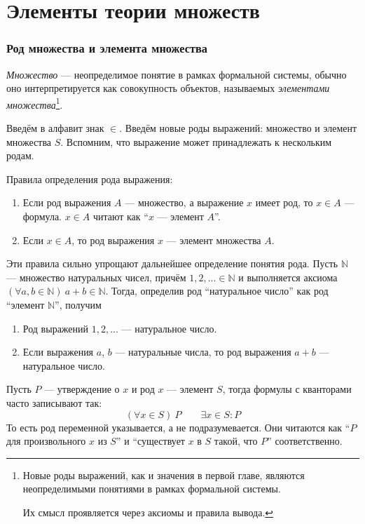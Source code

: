 \part{Элементы теории множеств}

\section{Род множества и элемента множества}

 {\it Множество} --- неопределимое понятие в рамках формальной системы,
обычно оно интерпретируется как совокупность объектов,
называемых {\it элементами множества}\footnote{
	Новые роды выражений, как и значения в первой главе,
	являются неопределимыми понятиями в рамках
	формальной системы.

	Их смысл проявляется через аксиомы и правила вывода.
}.

Введём в алфавит знак $\in$.
Введём новые роды выражений: множество и элемент множества $S$.
Вспомним, что выражение может принадлежать к нескольким родам.

Правила определения рода выражения:
\begin{enumerate}
	\item{}Если род выражения $A$ --- множество, а выражение $x$
	имеет род, то $x\in A$ --- формула.
	$x\in A$ читают как ``$x$ --- элемент $A$''.
	\item{}Если $x\in A$, то род выражения $x$ --- элемент множества $A$.
\end{enumerate}

\newcommand\N{\mathbb N}
Эти правила сильно упрощают дальнейшее определение понятия рода.
Пусть $\N$ --- множество
натуральных чисел, причём $1,2,...\in\N$ и выполняется
аксиома $(\forall a,b\in\N)~a+b\in\N$.
Тогда, определив род ``натуральное число'' как род ``элемент $\N$'', получим
\begin{enumerate}
	\item{}Род выражений $1,2,...$ --- натуральное число.
	\item{}Если выражения $a$, $b$ --- натуральные числа,
	то род выражения $a+b$ --- натуральное число.
\end{enumerate}

Пусть $P$ --- утверждение о $x$ и род $x$ --- элемент $S$, тогда
формулы с кванторами часто записывают так:
\[
	(\forall x\in S)~P\qquad \exists x\in S:P
\]
То есть род переменной указывается, а не подразумевается.
Они читаются как ``$P$ для произвольного $x$ из $S$'' и
``существует $x$ в $S$ такой, что $P$'' соответственно.

